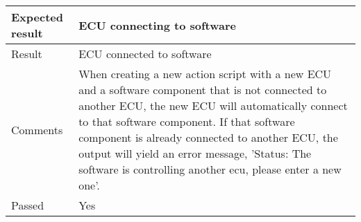 \begin{table}[H]
\begin{tabularx}{1.0\textwidth}{
    |p{}     %
    |p{}|    %
}
Expected result
& ECU connecting to software
\\
\hline

Result
& ECU connected to software
\\
\hline

Comments
& When creating a new action script with a new ECU and a software component that is not connected to another ECU, the new ECU will automatically connect to that software component. If that software component is already connected to another ECU, the output will yield an error message, 'Status: The software is controlling another ecu, please enter a new one'.
\\
\hline

Passed
& Yes
\\
\hline

\end{tabularx}
\end{table}

